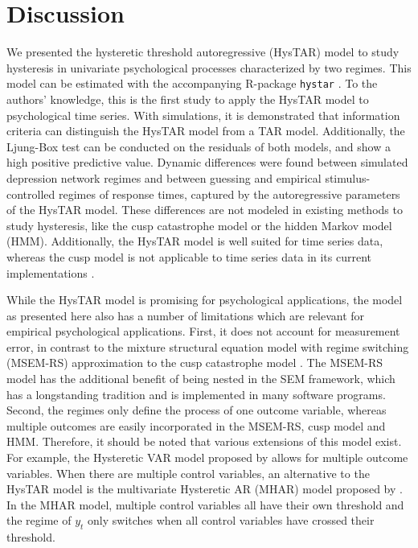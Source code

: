 \documentclass{article}
\begin{document}
\section{Discussion} \label{sec:discussion}
We presented the hysteretic threshold autoregressive (HysTAR) model \citep{bar1, bar2} to study hysteresis in univariate psychological processes characterized by two regimes.
This model can be estimated with the accompanying \textsf{R}-package \texttt{hystar} \citep{R, R_hystar}.
To the authors' knowledge, this is the first study to apply the HysTAR model to psychological time series.
With simulations, it is demonstrated that information criteria can distinguish the HysTAR model from a TAR model. 
Additionally, the Ljung-Box test can be conducted on the residuals of both models, and show a high positive predictive value.
Dynamic differences were found between simulated depression network regimes and between guessing and empirical stimulus-controlled regimes of response times, captured by the autoregressive parameters of the HysTAR model. These differences are not modeled in existing methods to study hysteresis, like the cusp catastrophe model or the hidden Markov model (HMM).
Additionally, the HysTAR model is well suited for time series data, whereas the cusp model is not applicable to time series data in its current implementations \citep{R_cusp, chow2014regime}.

While the HysTAR model is promising for psychological applications, the model as presented here also has a number of limitations which are relevant for empirical psychological applications.
First, it does not account for measurement error, in contrast to the mixture structural equation model with regime switching (MSEM-RS) approximation to the cusp catastrophe model \citep{chow2014regime}.
The MSEM-RS model has the additional benefit of being nested in the SEM framework, which has a longstanding tradition and is implemented in many software programs.
Second, the regimes only define the process of one outcome variable, whereas multiple outcomes are easily incorporated in the MSEM-RS, cusp model and HMM.
Therefore, it should be noted that various extensions of this model exist. 
For example, the Hysteretic VAR model proposed by \citet{chen} allows for multiple outcome variables.
When there are multiple control variables, an alternative to the HysTAR model is the multivariate Hysteretic AR (MHAR) model proposed by \citet{tsay}. 
In the MHAR model, multiple control variables all have their own threshold and the regime of $y_t$ only switches when all control variables have crossed their threshold.
\end{document}
